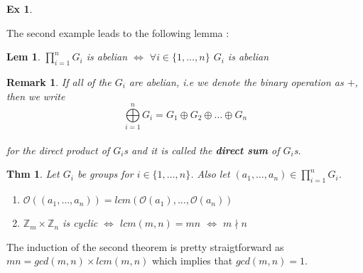 \documentclass[paper=a4, fontsize=11pt]{scrartcl}
\newcommand{\Zn}[1]{\mathbb{Z}_{#1}}
\newcommand{\nextline}{$ $ \newline \vspace{-0.15in}}
\newtheorem{theorem}{Thm}
\newtheorem{example}{Ex}
\newtheorem{lemma}{Lem}
\newtheorem*{remark}{Remark}
\begin{document}
\begin{example}
	\nextline
\end{example}

The second example leads to the following lemma : 

\begin{lemma}
	$\prod\limits_{i=1}^n G_i$ is abelian $\iff$ $\forall i \in \{1,\dots,n\}$ $G_i$ is abelian\\
\end{lemma}

\begin{remark}
	If all of the $G_i$ are abelian, i.e we denote the binary operation as $+$, then we write \\
	\begin{equation}\nonumber
		\bigoplus\limits_{i=1}^n G_i = G_1 \oplus G_2 \oplus \dots \oplus G_n
	\end{equation}\\
	for the direct product of $G_i$s and it is called the \textbf{direct sum} of $G_i$s.\\
\end{remark}

\begin{theorem}
Let $G_i$ be groups for $i\in\{1,\dots,n\}$. Also let $(a_1, \dots ,a_n) \in \prod\limits_{i=1}^n G_i$.
\begin{enumerate}[label=\arabic*)]
	\item $\mathcal{O}\left( (a_1, \dots ,a_n) \right) = lcm(\mathcal{O}(a_1),\dots,\mathcal{O}(a_n))$
	\item $\Zn{m}\times \Zn{n}$ is cyclic $\iff$ $lcm(m,n)=mn$ $\iff$ $m \nmid n$\\
\end{enumerate}
\end{theorem}

The induction of the second theorem is pretty straigtforward as $mn=gcd(m,n)\times lcm(m,n)$ which implies that $gcd(m,n)=1$.\\
\end{document}
